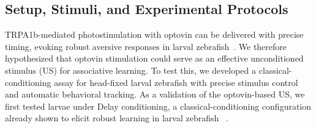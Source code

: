 \subsection{Setup, Stimuli, and Experimental Protocols}
TRPA1b-mediated photostimulation with optovin can be delivered with precise timing, evoking robust aversive responses in larval zebrafish~\cite{Wee2019}. We therefore hypothesized that optovin stimulation could serve as an effective unconditioned stimulus (US) for associative learning.
To test this, we developed a classical-conditioning assay for head-fixed larval zebrafish with precise stimulus control and automatic behavioral tracking. As a validation of the optovin-based US, we first tested larvae under Delay conditioning, a classical-conditioning configuration already shown to elicit robust learning in larval zebrafish ~\cite{aizenbergCerebellarDependentLearningLarval2011}.

